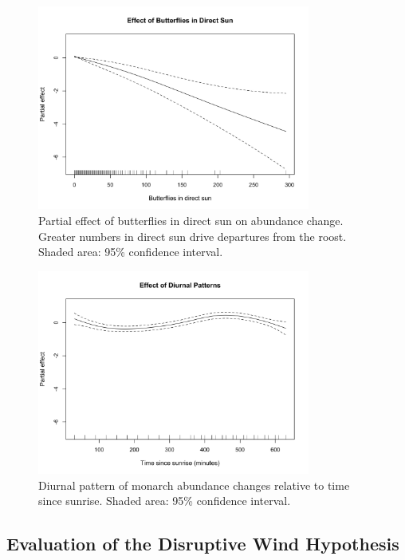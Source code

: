 \begin{figure}[htbp]
\centering
\includegraphics[width=0.8\textwidth]{supplemental/results/thesis_exports/figures/effect_butterflies_direct_sun.png}
\caption{Partial effect of butterflies in direct sun on abundance change. Greater numbers in direct sun drive departures from the roost. Shaded area: 95\% confidence interval.}\label{fig:effect_sun}
\end{figure}

\begin{figure}[htbp]
\centering
\includegraphics[width=0.8\textwidth]{supplemental/results/thesis_exports/figures/diurnal_patterns.png}
\caption{Diurnal pattern of monarch abundance changes relative to time since sunrise. Shaded area: 95\% confidence interval.}\label{fig:effect_diurnal}
\end{figure}

\subsection{Evaluation of the Disruptive Wind Hypothesis}

